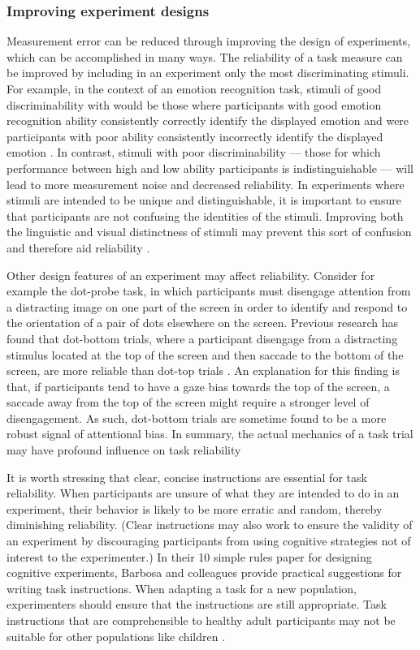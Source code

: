 \documentclass[a4paper,notitlepage,12pt]{article}
\begin{document}
\subsubsection{Improving experiment designs}

Measurement error can be reduced through improving the design of experiments, which can be accomplished in many ways. The reliability of a task measure can be improved by including in an experiment only the most discriminating stimuli. For example, in the context of an emotion recognition task, stimuli of good discriminability with would be those where participants with good emotion recognition ability consistently correctly identify the displayed emotion and were participants with poor ability consistently incorrectly identify the displayed emotion \cite{keutmann2015generating}. In contrast, stimuli with poor discriminability --- those for which performance between high and low ability participants is indistinguishable --- will lead to more measurement noise and decreased reliability. In experiments where stimuli are intended to be unique and distinguishable, it is important to ensure that participants are not confusing the identities of the stimuli. Improving both the linguistic and visual distinctness of stimuli may prevent this sort of confusion and therefore aid reliability \cite{yoo2022importance}.  

Other design features of an experiment may affect reliability. Consider for example the dot-probe task, in which participants must disengage attention from a distracting image on one part of the screen in order to identify and respond to the orientation of a pair of dots elsewhere on the screen. Previous research has found that dot-bottom trials, where a participant disengage from a distracting stimulus located at the top of the screen and then saccade to the bottom of the screen, are more reliable than dot-top trials \cite{price2015empirical, aday2019extended}. An explanation for this finding is that, if participants tend to have a gaze bias towards the top of the screen, a saccade away from the top of the screen might require a stronger level of disengagement. As such, dot-bottom trials are sometime found to be a more robust signal of attentional bias. In summary, the actual mechanics of a task trial may have profound influence on task reliability 

It is worth stressing that clear, concise instructions are essential for task reliability. When participants are unsure of what they are intended to do in an experiment, their behavior is likely to be more erratic and random, thereby diminishing reliability. (Clear instructions may also work to ensure the validity of an experiment by discouraging participants from using cognitive strategies not of interest to the experimenter.) In their 10 simple rules paper for designing cognitive experiments, Barbosa and colleagues \cite{barbosa2022practical} provide practical suggestions for writing task instructions. When adapting a task for a new population, experimenters should ensure that the instructions are still appropriate. Task instructions that are comprehensible to healthy adult participants may not be suitable for other populations like children \cite{hughes2002measuring}. 
\end{document}
